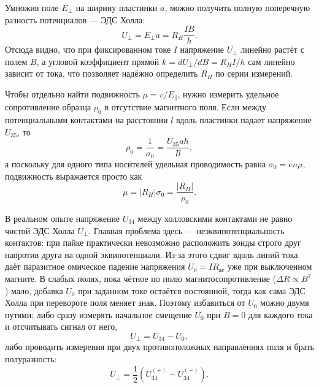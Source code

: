 \documentclass[reprint, amsmath, amssymb, aps, pra, nofootinbib]{revtex4-2}
\begin{document}
Умножив поле $E_\perp$ на ширину пластинки $a$, можно получить полную поперечную разность потенциалов — ЭДС Холла:
\begin{equation}
U_\perp = E_\perp a = R_H \frac{I B}{h}.
\label{eq:u_hall}
\end{equation}
Отсюда видно, что при фиксированном токе $I$ напряжение $U_\perp$ линейно растёт с полем $B$, а угловой коэффициент прямой $k = dU_\perp / dB = R_H I / h$ сам линейно зависит от тока, что позволяет надёжно определить $R_H$ по серии измерений.

Чтобы отдельно найти подвижность $\mu = v / E_\parallel$, нужно измерить удельное сопротивление образца $\rho_0$ в отсутствие магнитного поля. Если между потенциальными контактами на расстоянии $l$ вдоль пластинки падает напряжение $U_{35}$, то
\begin{equation}
\rho_0 = \frac{1}{\sigma_0} = \frac{U_{35} a h}{I l},
\label{eq:rho}
\end{equation}
а поскольку для одного типа носителей удельная проводимость равна $\sigma_0 = e n \mu$, подвижность выражается просто как
\begin{equation}
\mu = |R_H| \sigma_0 = \frac{|R_H|}{\rho_0}.
\label{eq:mobility}
\end{equation}

В реальном опыте напряжение $U_{34}$ между холловскими контактами не равно чистой ЭДС Холла $U_\perp$.
Главная проблема здесь — неэквипотенциальность контактов: при пайке практически невозможно расположить зонды строго друг напротив друга на одной эквипотенциали.
Из-за этого сдвиг вдоль линий тока даёт паразитное омическое падение напряжения $U_0 = I R_{\text{ас}}$ уже при выключенном магните.
В слабых полях, пока чётное по полю магнитосопротивление ($\Delta R \propto B^2$) мало, добавка $U_0$ при заданном токе остаётся постоянной, тогда как сама ЭДС Холла при перевороте поля меняет знак.
Поэтому избавиться от $U_0$ можно двумя путями: либо сразу измерять начальное смещение $U_0$ при $B = 0$ для каждого тока и отсчитывать сигнал от него,
\begin{equation}
U_\perp = U_{34} - U_0,
\label{eq:u_sub}
\end{equation}
либо проводить измерения при двух противоположных направлениях поля и брать полуразность:
\begin{equation}
U_\perp = \frac{1}{2} \left( U_{34}^{(+)} - U_{34}^{(-)} \right).
\label{eq:u_rev}
\end{equation}
\end{document}

